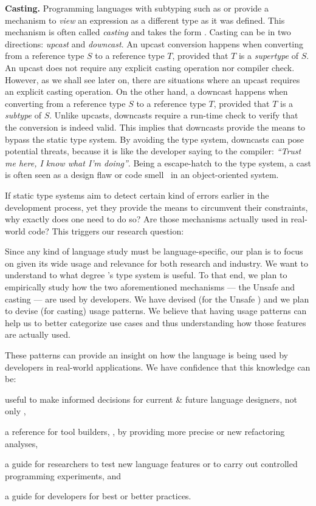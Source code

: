 \textbf{Casting.}
Programming languages with subtyping such as \java{} or \cpp{} provide a mechanism to \emph{view} an expression as a different type as it was defined.
This mechanism is often called \emph{casting} and takes the form .
Casting can be in two directions: \emph{upcast} and \emph{downcast}.
An upcast conversion happens when converting from a reference type $S$ to a reference type $T$, provided that $T$ is a \emph{supertype} of $S$.
An upcast does not require any explicit casting operation nor compiler check.
However, as we shall see later on, there are situations where an upcast requires an explicit casting operation.
On the other hand, a downcast happens when converting from a reference type $S$ to a reference type $T$, provided that $T$ is a \emph{subtype} of $S$.
Unlike upcasts, downcasts require a run-time check to verify that the conversion is indeed valid.
This implies that downcasts provide the means to bypass the static type system.
By avoiding the type system, downcasts can pose potential threats, because it is like the developer saying to the compiler: \emph{``Trust me here, I know what I'm doing''}.
Being a escape-hatch to the type system, a cast is often seen as a design flaw or code smell~\cite{tufanoWhenWhyYour2015} in an object-oriented system.

If static type systems aim to detect certain kind of errors earlier in the development process,
yet they provide the means to circumvent their constraints,
why exactly does one need to do so?
Are those mechanisms actually used in real-world code?
This triggers our research question:


Since any kind of language study must be language-specific,
our plan is to focus on \java{} given its wide usage and relevance for both research and industry.
We want to understand to what degree \java{}'s type system is useful.
To that end,
we plan to empirically study how the two aforementioned mechanisms
--- the Unsafe \api{} and casting ---
are used by developers.
We have devised (for the Unsafe \api{}) and we plan to devise (for casting) usage patterns.
We believe that having usage patterns can help us to better categorize use cases and thus understanding how those features are actually used.

These patterns can provide an insight on how the language is being used by developers in real-world applications.
We have confidence that this knowledge can be:
\begin{inparaenum}[a)]
\item useful to make informed decisions for current \& future language designers, not only \java{},
\item a reference for tool builders, \eg{}, by providing more precise or new refactoring analyses,
\item a guide for researchers to test new language features or to carry out controlled programming experiments, and
\item a guide for developers for best or better practices.
\end{inparaenum}

